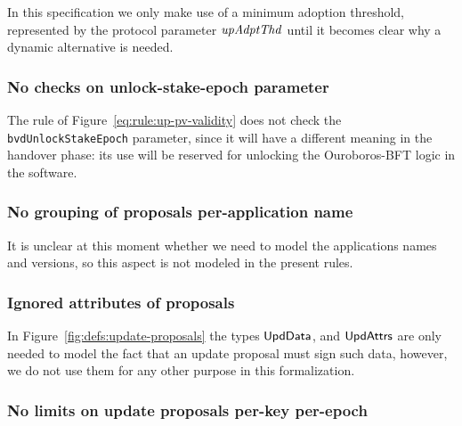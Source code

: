 In this specification we only make use of a minimum adoption threshold,
represented by the protocol parameter $\mathit{upAdptThd}$ until it becomes clear
why a dynamic alternative is needed.

\subsubsection{No checks on unlock-stake-epoch parameter}
\label{sec:no-unlock-stake-epoch-check}

The rule of Figure~\ref{eq:rule:up-pv-validity} does not check the
\lstinline{bvdUnlockStakeEpoch} parameter, since it will have a different
meaning in the handover phase: its use will be reserved for unlocking the
Ouroboros-BFT logic in the software.

\subsubsection{No grouping of proposals per-application name}
\label{sec:no-app-up-grouping}

It is unclear at this moment whether we need to model the applications names
and versions, so this aspect is not modeled in the present rules.

\subsubsection{Ignored attributes of proposals}

In Figure~\ref{fig:defs:update-proposals} the types
$\mathsf{UpdData}$, and $\mathsf{UpdAttrs}$ are only needed to model the fact that
an update proposal must sign such data, however, we do not use them for any
other purpose in this formalization.

\subsubsection{No limits on update proposals per-key per-epoch}
\label{sec:no-up-limits}

